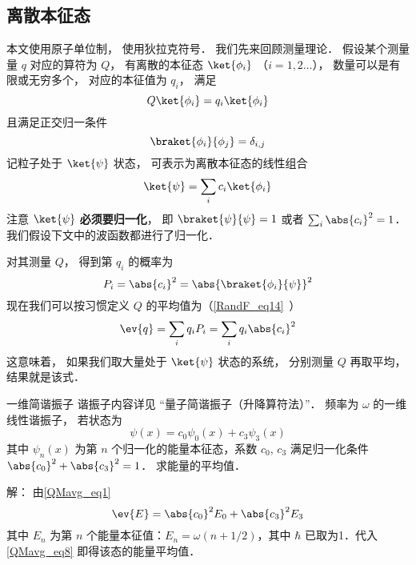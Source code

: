 
\begin{issues}
\issueTODO 
\end{issues}


\subsection{离散本征态}

本文使用原子单位制， 使用狄拉克符号． 我们先来回顾测量理论． 假设某个测量量 $q$ 对应的算符为 $Q$， 有离散的本征态 $\ket{\phi_i}$ （$i = 1,2\dots$）， 数量可以是有限或无穷多个， 对应的本征值为 $q_i$， 满足
\begin{equation}\label{QMavg_eq3}
Q\ket{\phi_i} = q_i \ket{\phi_i}
\end{equation}
且满足正交归一条件
\begin{equation}\label{QMavg_eq4}
\braket{\phi_i}{\phi_j} = \delta_{i,j}
\end{equation}
记粒子处于 $\ket{\psi}$ 状态， 可表示为离散本征态的线性组合
\begin{equation}\label{QMavg_eq2}
\ket{\psi} = \sum_i c_i \ket{\phi_i}
\end{equation}
注意 $\ket{\psi}$ \textbf{必须要归一化}， 即 $\braket{\psi}{\psi} = 1$ 或者 $\sum_i \abs{c_i}^2 = 1$． 我们假设下文中的波函数都进行了归一化．

对其测量 $Q$， 得到第 $q_i$ 的概率为
\begin{equation}
P_i = \abs{c_i}^2 = \abs{\braket{\phi_i}{\psi}}^2
\end{equation}
现在我们可以按习惯定义 $Q$ 的平均值为（\autoref{RandF_eq14}~）
\begin{equation}\label{QMavg_eq1}
\ev{q} = \sum_i q_i P_i = \sum_i q_i \abs{c_i}^2
\end{equation}
这意味着， 如果我们取大量处于 $\ket{\psi}$ 状态的系统， 分别测量 $Q$ 再取平均， 结果就是该式．

\begin{example}{一维简谐振子}
谐振子内容详见 “量子简谐振子（升降算符法）”． 频率为 $\omega$ 的一维线性谐振子， 若状态为
\begin{equation}
\psi(x)=c_0 \psi_0(x)+c_3\psi_3(x)
\end{equation}
其中 $\psi_n(x)$ 为第 $n$ 个归一化的能量本征态，系数 $c_0$, $c_3$ 满足归一化条件 $\abs{c_0}^2+\abs{c_3}^2 = 1$． 求能量的平均值．

解： 由\autoref{QMavg_eq1}
\begin{equation}\label{QMavg_eq8}
\ev{E}=\abs{c_0}^2 E_0+\abs{c_3}^2 E_3
\end{equation}
其中 $E_n$ 为第 $n$ 个能量本征值：$E_n=\omega(n+1/2)$，其中 $\hbar$ 已取为1．代入\autoref{QMavg_eq8} 即得该态的能量平均值．
\end{example}

